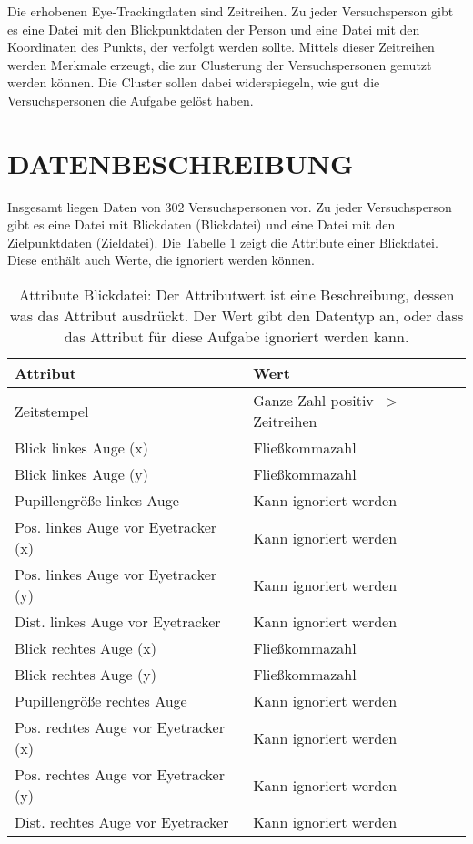\documentclass[a4paper,twoside]{article}
\begin{document}
Die erhobenen Eye-Trackingdaten sind Zeitreihen. Zu jeder Versuchsperson gibt es eine Datei mit den Blickpunktdaten der Person und eine Datei mit den Koordinaten des Punkts, der verfolgt werden sollte. Mittels dieser Zeitreihen werden Merkmale erzeugt, die zur Clusterung der Versuchspersonen genutzt werden k\"onnen. Die Cluster sollen dabei widerspiegeln, wie gut die Versuchspersonen die Aufgabe gel\"ost haben.

\section{\uppercase{Datenbeschreibung}}
\noindent
Insgesamt liegen Daten von 302 Versuchspersonen vor. Zu jeder Versuchsperson gibt es eine Datei mit Blickdaten (Blickdatei) und eine Datei mit den Zielpunktdaten (Zieldatei). Die Tabelle \ref{tab:AttrBlickdatei} zeigt die Attribute einer Blickdatei. Diese enth\"alt auch Werte, die ignoriert werden k\"onnen.

\begin{table}[h]
	\caption{\label{tab:AttrBlickdatei}Attribute Blickdatei: Der Attributwert ist eine Beschreibung, dessen was das Attribut ausdr\"uckt. Der Wert gibt den Datentyp an, oder dass das Attribut f\"ur diese Aufgabe ignoriert werden kann.}
	\noindent \centering{}
	\bgroup
	\def\arraystretch{2}  %
	\begin{tabular}{|l|l|}
		\hline 
		\textbf{Attribut} & \textbf{Wert}\\
		\hline \hline
		Zeitstempel & Ganze Zahl positiv --> Zeitreihen\\
		\hline
		Blick linkes Auge (x) & Flie\ss{}kommazahl \\
		\hline
		Blick linkes Auge (y) & Flie\ss{}kommazahl \\
		\hline
		Pupillengr\"o\ss{}e linkes Auge & Kann ignoriert werden \\
		\hline
		Pos. linkes Auge vor Eyetracker (x) & Kann ignoriert werden \\
		\hline
		Pos. linkes Auge vor Eyetracker (y) & Kann ignoriert werden \\
		\hline
		Dist. linkes Auge vor Eyetracker & Kann ignoriert werden \\
		\hline
		Blick rechtes Auge (x) & Flie\ss{}kommazahl \\
		\hline
		Blick rechtes Auge (y) & Flie\ss{}kommazahl \\
		\hline
		Pupillengr\"o\ss{}e rechtes Auge & Kann ignoriert werden \\
		\hline
		Pos. rechtes Auge vor Eyetracker (x) & Kann ignoriert werden \\
		\hline
		Pos. rechtes Auge vor Eyetracker (y) & Kann ignoriert werden \\
		\hline
		Dist. rechtes Auge vor Eyetracker & Kann ignoriert werden \\
		\hline
	\end{tabular}
	\egroup
\end{table}
\end{document}
